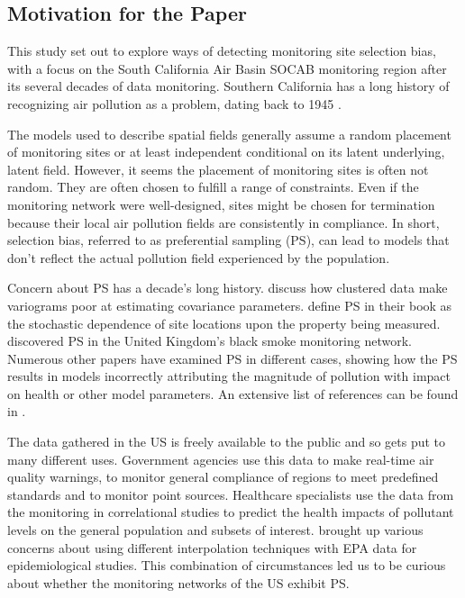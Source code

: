 \subsection{Motivation for the Paper}
\label{subsec:motivation}
This study set out to explore ways of detecting monitoring site selection bias, with a focus on the South California Air Basin SOCAB monitoring region after its several decades of data monitoring.  Southern California has a long history of recognizing air pollution as a problem, dating back to 1945 \citep{CASCAQMD:2015}.

The models used to describe spatial fields generally assume a random placement of monitoring sites or at least independent conditional on its latent underlying, latent field.  However, it seems the placement of monitoring sites is often not random. They are often chosen to fulfill a range of constraints. Even if the monitoring network were well-designed, sites might be chosen for termination because their local air pollution fields are consistently in compliance.  In short, selection bias, referred to as preferential sampling (PS), can lead to models that don't reflect the actual pollution field experienced by the population. 

Concern about PS has a decade's long history. \citet{isaaks1988spatial} discuss how clustered data make variograms poor at estimating covariance parameters. \cite{diggle:07} define PS in their book as the stochastic dependence of site locations upon the property being measured. \cite{shaddick2012preferential} discovered  PS in the United Kingdom's black smoke monitoring network. Numerous other papers have examined PS in different cases, showing how the PS results in models incorrectly attributing the magnitude of pollution with impact on health or other model parameters.  An extensive list of references can be found in \citep{Zidek:2012}.  

The data gathered in the US is freely available to the public and so gets put to many different uses.  Government agencies use this data to make real-time air quality warnings, to monitor general compliance of regions to meet predefined standards and to monitor point sources.  Healthcare specialists use the data from the monitoring in correlational studies to predict the health impacts of pollutant levels on the general population and subsets of interest.  \cite{wong2004comparison} brought up various concerns about using different interpolation techniques with EPA data for epidemiological studies.  This combination of circumstances led us to be curious about whether the monitoring networks of the US exhibit PS.